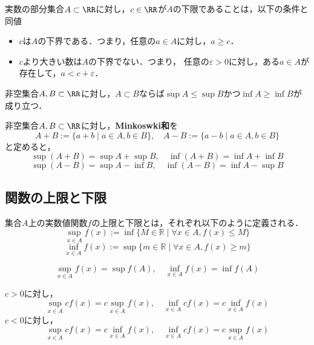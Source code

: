 \begin{proposition}[下限の特徴付け]
    実数の部分集合$A \subset \RR$に対し，$c \in \RR$が$A$の下限であることは，以下の条件と同値
    \begin{itemize}
        \item $c$は$A$の下界である．つまり，任意の$a \in A$に対し，$a \ge c$．
        \item $c$より大きい数は$A$の下界でない．つまり， 任意の$\varepsilon > 0$に対し，ある$a \in A$が存在して，$a < c + \varepsilon$．
    \end{itemize}
\end{proposition}

\begin{proposition}
    非空集合$A,B \subset \RR$に対し，$A \subset B$ならば$\sup A \le \sup B$かつ$\inf A \ge \inf B$が成り立つ．
\end{proposition}

\begin{proposition}
    非空集合$A,B \subset \RR$に対し，\textbf{Minkoswki和}を\[ A+B := \{a+b \mid a \in A, b \in B\}, \quad A-B := \{a-b \mid a \in A, b \in B\} \]と定めると，
    \[\sup (A+B) = \sup A + \sup B, \quad \inf (A+B) = \inf A + \inf B\]
    \[\sup (A-B) = \sup A - \inf B, \quad \inf (A-B) = \inf A - \sup B\]
\end{proposition}

\subsection{関数の上限と下限}

\begin{definition}
    集合$A$上の実数値関数$f$の上限と下限とは，それぞれ以下のように定義される．
    \[\sup_{x \in A} f(x) := \inf \{ M \in \mathbb{R} \mid \forall x \in A, f(x) \le M \}\]
    \[\inf_{x \in A} f(x) := \sup \{ m \in \mathbb{R} \mid \forall x \in A, f(x) \ge m \}\]
\end{definition}

\begin{proposition}
    \[
    \sup_{x \in A} f(x) = \sup f(A), \quad \inf_{x \in A} f(x) = \inf f(A)
    \]
\end{proposition}

\begin{proposition}
    $c>0$に対し，\[\sup_{x \in A} cf(x) = c \sup_{x \in A} f(x), \quad \inf_{x \in A} cf(x) = c \inf_{x \in A} f(x)\]
    $c<0$に対し，\[\sup_{x \in A} cf(x) = c \inf_{x \in A} f(x), \quad \inf_{x \in A} cf(x) = c \sup_{x \in A} f(x)\]
\end{proposition}

